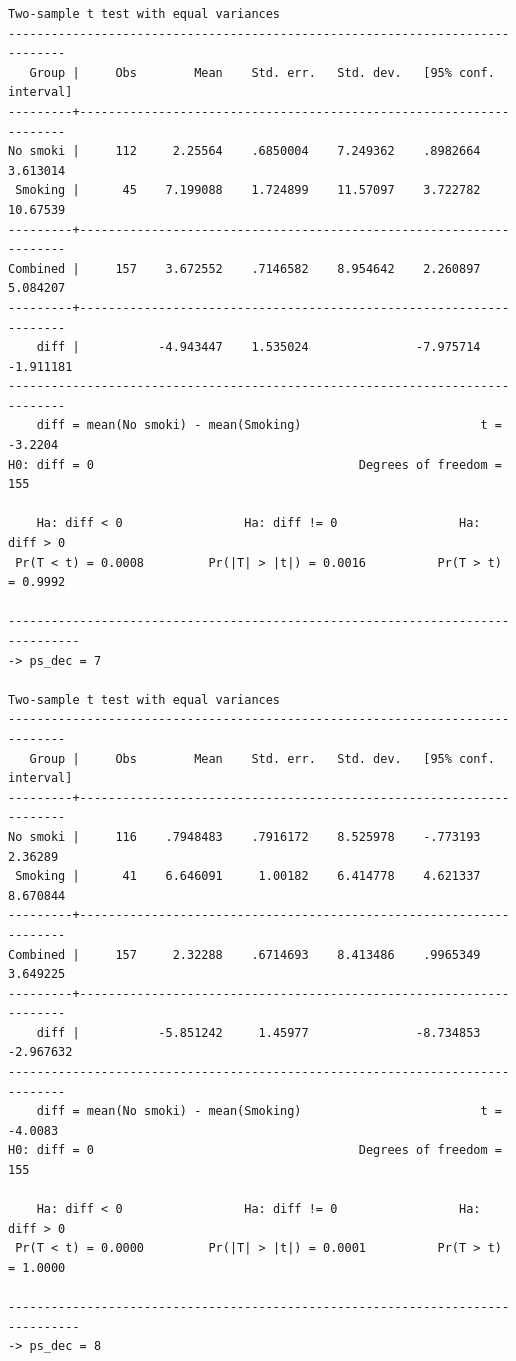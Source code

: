 \documentclass[
  10pt,
]{book}
\begin{document}
\begin{verbatim}
Two-sample t test with equal variances
------------------------------------------------------------------------------
   Group |     Obs        Mean    Std. err.   Std. dev.   [95% conf. interval]
---------+--------------------------------------------------------------------
No smoki |     112     2.25564    .6850004    7.249362    .8982664    3.613014
 Smoking |      45    7.199088    1.724899    11.57097    3.722782    10.67539
---------+--------------------------------------------------------------------
Combined |     157    3.672552    .7146582    8.954642    2.260897    5.084207
---------+--------------------------------------------------------------------
    diff |           -4.943447    1.535024               -7.975714   -1.911181
------------------------------------------------------------------------------
    diff = mean(No smoki) - mean(Smoking)                         t =  -3.2204
H0: diff = 0                                     Degrees of freedom =      155

    Ha: diff < 0                 Ha: diff != 0                 Ha: diff > 0
 Pr(T < t) = 0.0008         Pr(|T| > |t|) = 0.0016          Pr(T > t) = 0.9992

--------------------------------------------------------------------------------
-> ps_dec = 7

Two-sample t test with equal variances
------------------------------------------------------------------------------
   Group |     Obs        Mean    Std. err.   Std. dev.   [95% conf. interval]
---------+--------------------------------------------------------------------
No smoki |     116    .7948483    .7916172    8.525978    -.773193     2.36289
 Smoking |      41    6.646091     1.00182    6.414778    4.621337    8.670844
---------+--------------------------------------------------------------------
Combined |     157     2.32288    .6714693    8.413486    .9965349    3.649225
---------+--------------------------------------------------------------------
    diff |           -5.851242     1.45977               -8.734853   -2.967632
------------------------------------------------------------------------------
    diff = mean(No smoki) - mean(Smoking)                         t =  -4.0083
H0: diff = 0                                     Degrees of freedom =      155

    Ha: diff < 0                 Ha: diff != 0                 Ha: diff > 0
 Pr(T < t) = 0.0000         Pr(|T| > |t|) = 0.0001          Pr(T > t) = 1.0000

--------------------------------------------------------------------------------
-> ps_dec = 8


\end{verbatim}
\end{document}
